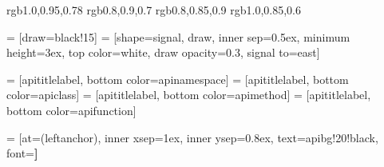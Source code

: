 
%
%
\definecolor{apinamespace} {rgb}{1.0,0.95,0.78}
\definecolor{apimethod}    {rgb}{0.8,0.9,0.7}
\definecolor{apiclass}     {rgb}{0.8,0.85,0.9}
\definecolor{apifunction}  {rgb}{1.0,0.85,0.6}

%
%
    = [draw=black!15]
 = [shape=signal, draw, inner sep=0.5ex,
                             minimum height=3ex, top color=white,
                             draw opacity=0.3,
                             signal to=east]

 = [apititlelabel, bottom color=apinamespace]
     = [apititlelabel, bottom color=apiclass]
    = [apititlelabel, bottom color=apimethod]
  = [apititlelabel, bottom color=apifunction]

 = [at=(leftanchor), inner xsep=1ex, inner ysep=0.8ex,
                               text=apibg!20!black, font=\bfseries \small]


